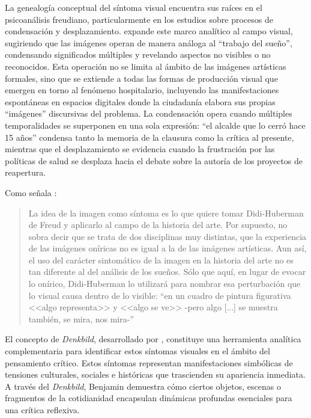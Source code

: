 La genealogía conceptual del síntoma visual encuentra sus raíces en el psicoanálisis freudiano, particularmente en los estudios sobre procesos de condensación y desplazamiento. \parencite{DidiHuberman2011} expande este marco analítico al campo visual, sugiriendo que las imágenes operan de manera análoga al ``trabajo del sueño'', condensando significados múltiples y revelando aspectos no visibles o no reconocidos. Esta operación no se limita al ámbito de las imágenes artísticas formales, sino que se extiende a todas las formas de producción visual que emergen en torno al fenómeno hospitalario, incluyendo las manifestaciones espontáneas en espacios digitales donde la ciudadanía elabora sus propias ``imágenes'' discursivas del problema. La condensación opera cuando múltiples temporalidades se superponen en una sola expresión: ``el alcalde que lo cerró hace 15 años'' condensa tanto la memoria de la clausura como la crítica al presente, mientras que el desplazamiento se evidencia cuando la frustración por las políticas de salud se desplaza hacia el debate sobre la autoría de los proyectos de reapertura.

Como señala \parencite[p. 37]{VegaArevalo2017}:

\begin{quote}
    La idea de la imagen como síntoma es lo que quiere tomar Didi-Huberman de Freud y aplicarlo al campo de la historia del arte. Por supuesto, no sobra decir que se trata de dos disciplinas muy distintas, que la experiencia de las imágenes oníricas no es igual a la de las imágenes artísticas. Aun así, el uso del carácter sintomático de la imagen en la historia del arte no es tan diferente al del análisis de los sueños. Sólo que aquí, en lugar de evocar lo onírico, Didi-Huberman lo utilizará para nombrar esa perturbación que lo visual causa dentro de lo visible: ``en un cuadro de pintura figurativa <<algo representa>> y <<algo se ve>> -pero algo [...] se muestra también, se mira, nos mira-''
\end{quote}

El concepto de \textit{Denkbild}, desarrollado por \parencite{Benjamin2004}, constituye una herramienta analítica complementaria para identificar estos síntomas visuales en el ámbito del pensamiento crítico. Estos síntomas representan manifestaciones simbólicas de tensiones culturales, sociales e históricas que trascienden su apariencia inmediata. A través del \textit{Denkbild}, Benjamin demuestra cómo ciertos objetos, escenas o fragmentos de la cotidianidad encapsulan dinámicas profundas esenciales para una crítica reflexiva.

